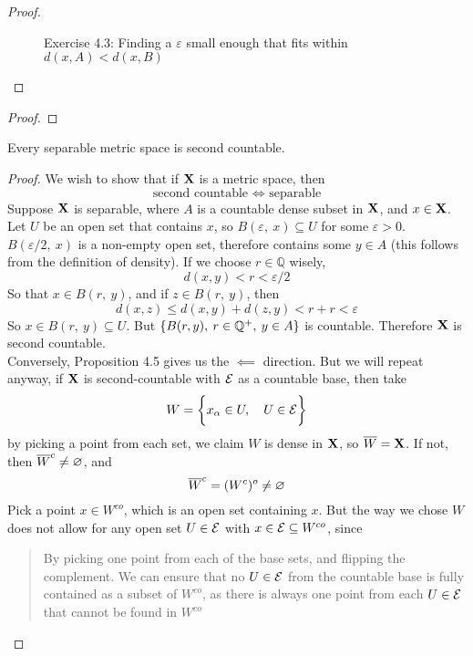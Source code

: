 \documentclass[../../main.tex]{subfiles}
\begin{document}
\begin{proof}
\begin{figure}
    \caption{Exercise 4.3: Finding a $\varepsilon$ small enough that fits within $d(x,A) < d(x,B)$}
    \label{fig:ex4.3}
\end{figure}
\end{proof}
\newpage

\begin{wts}
    
\end{wts}
\begin{proof}
    
\end{proof}
\newpage


\begin{wts}
    Every separable metric space is second countable.
\end{wts}
\begin{proof}
    We wish to show that if ${\mathbf{X}}$ is a metric space, then
    \[
        \text{second countable } \iff \text{ separable}
    \]
    Suppose ${\mathbf{X}}$ is separable, where $A$ is a countable dense subset in ${\mathbf{X}}$, and $x\in{\mathbf{X}}$. Let $U$ be an open set that contains $x$, so $B(\varepsilon,\: x)\subseteq U$ for some $\varepsilon>0$. $B(\varepsilon/2,\: x)$ is a non-empty open set, therefore contains some $y\in A$ (this follows from the definition of density). If we choose $r\in \mathbb{Q}$ wisely,
    \[
        d(x,y) < r < \varepsilon/2
    \]
    So that $x\in B(r,\: y)$, and if $z\in B(r,\: y)$, then 
    \[
        d(x,z)\leq d(x,y) + d(z,y)< r + r < \varepsilon
    \]
    So $x \in B(r,\: y)\subseteq U$. But $\{B(r,y),\: r\in\mathbb{Q}^+,\: y\in A\}$ is countable. Therefore ${\mathbf{X}}$ is second countable.\\
    
    Conversely, Proposition 4.5 gives us the $\impliedby$ direction. But we will repeat anyway, if ${\mathbf{X}}$ is second-countable with $\mathcal{E}$ as a countable base, then take 
    \[
        W = \biggl\{{x_\alpha\in U,\quad U\in \mathcal{E}}\biggr\}
    \]
    by picking a point from each set, we claim $W$ is dense in ${\mathbf{X}}$, so $\overline{W}={\mathbf{X}}$. If not, then $\overline{W}^c \neq\varnothing$, and 
    \[
        \overline{W}^c = (W^c)^o \neq \varnothing
    \]
    Pick a point $x \in W^{co}$, which is an open set containing $x$. But the way we chose $W$ does not allow for any open set $U\in \mathcal{E}$ with $x\in\mathcal{E} \subseteq W^{co}$, since
    \begin{quote}
        By picking one point from each of the base sets, and flipping the complement. We can ensure that no $U\in\mathcal{E}$ from the countable base is fully contained as a subset of $W^{co}$, as there is always one point from each $U\in\mathcal{E}$ that cannot be found in $W^{co}$
    \end{quote}
\end{proof}
\newpage
\end{document}

